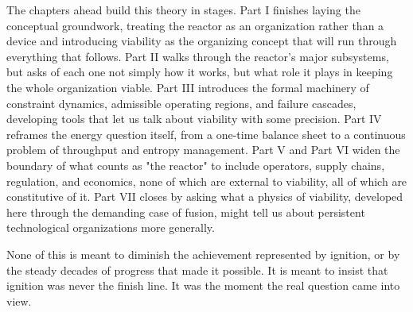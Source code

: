 The chapters ahead build this theory in stages. Part I finishes laying the conceptual groundwork, treating the reactor as an organization rather than a device and introducing viability as the organizing concept that will run through everything that follows. Part II walks through the reactor's major subsystems, but asks of each one not simply how it works, but what role it plays in keeping the whole organization viable. Part III introduces the formal machinery of constraint dynamics, admissible operating regions, and failure cascades, developing tools that let us talk about viability with some precision. Part IV reframes the energy question itself, from a one-time balance sheet to a continuous problem of throughput and entropy management. Part V and Part VI widen the boundary of what counts as "the reactor" to include operators, supply chains, regulation, and economics, none of which are external to viability, all of which are constitutive of it. Part VII closes by asking what a physics of viability, developed here through the demanding case of fusion, might tell us about persistent technological organizations more generally.

None of this is meant to diminish the achievement represented by ignition, or by the steady decades of progress that made it possible. It is meant to insist that ignition was never the finish line. It was the moment the real question came into view.
